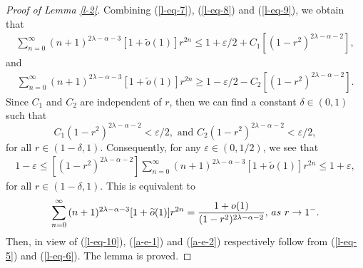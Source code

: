 \documentclass[10pt,a4paper]{amsart}
\begin{document}
\begin{proof}[Proof of Lemma \ref{l-2}]
Combining (\ref{l-eq-7}), (\ref{l-eq-8}) and (\ref{l-eq-9}), we obtain that
    \begin{eqnarray}
[{(1-r^2)^{2\lambda-\alpha-2}}]\sum_{n=0}^{\infty}{(n+1)^{2\lambda-\alpha-3}}[1+\widetilde{o}(1)]r^{2n}\leq 1+\varepsilon/2+C_1[{(1-r^2)^{2\lambda-\alpha-2}}], \nonumber
 \end{eqnarray}
 and 
     \begin{eqnarray}
[{(1-r^2)^{2\lambda-\alpha-2}}]\sum_{n=0}^{\infty}{(n+1)^{2\lambda-\alpha-3}}[1+\widetilde{o}(1)]r^{2n}\geq 1-\varepsilon/2-C_2[{(1-r^2)^{2\lambda-\alpha-2}}]. \nonumber
 \end{eqnarray}
Since $C_1$ and $C_2$ are independent of $r$, then we can find a constant $\delta\in (0,1)$ such that
$$C_1{(1-r^2)^{2\lambda-\alpha-2}}<\varepsilon/2,\,\,\text{and}\,\, C_2{(1-r^2)^{2\lambda-\alpha-2}}<\varepsilon/2,$$
for all $r\in (1-\delta, 1)$. Consequently, for any $\varepsilon\in (0,1/2)$, we see that 
    \begin{eqnarray}
1-\varepsilon\leq [{(1-r^2)^{2\lambda-\alpha-2}}]\sum_{n=0}^{\infty}{(n+1)^{2\lambda-\alpha-3}}[1+\widetilde{o}(1)]r^{2n}\leq 1+\varepsilon, \nonumber
 \end{eqnarray}
for all $r\in (1-\delta, 1)$. This is equivalent to  
 \begin{equation}\label{l-eq-10}
\sum_{n=0}^{\infty}{(n+1)^{2\lambda-\alpha-3}}[1+\widetilde{o}(1)]r^{2n}=\frac{1+{o}(1)}{(1-r^2)^{2\lambda-\alpha-2}},\, {\textup{as}}\,\, r\rightarrow 1^{-}. 
 \end{equation}
 Then, in view of (\ref{l-eq-10}), (\ref{a-e-1}) and (\ref{a-e-2}) respectively follow from (\ref{l-eq-5}) and (\ref{l-eq-6}).  The lemma is proved.
 \end{proof} 
\end{document}
